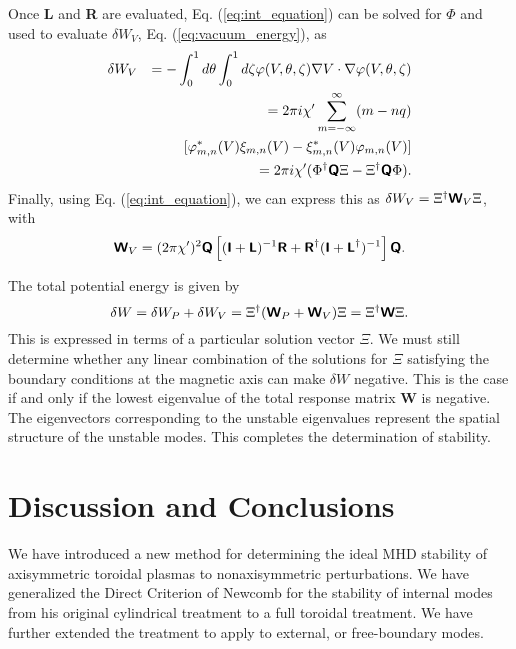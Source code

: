\documentclass[prb,twocolumn,showpacs,preprintnumbers,amsmath,amssymb]{revtex4}
\renewcommand*{\t}[1]{\hbox{\sffamily\bfseries #1}}
\begin{document}
Once \t{L} and \t{R} are evaluated, Eq. (\ref{eq:int_equation}) can be
solved for $\Phi$ and used to evaluate $\delta W_V$,
Eq. (\ref{eq:vacuum_energy}), as
\begin{eqnarray}
\delta W_V 
&&= - \int_0^1 d\theta \int_0^1 d\zeta \varphi(V,\theta,\zeta)
	\nabla V \cdot \nabla \varphi(V,\theta,\zeta) \nonumber \\
&&= 2 \pi i \chi' \sum_{m=-\infty}^\infty (m-nq) \nonumber \\
&&\qquad [\varphi^*_{m,n}(V) \xi_{m,n}(V) 
	- \xi^*_{m,n}(V) \varphi_{m,n}(V) ] \nonumber \\
&&= 2 \pi i \chi' 
	(\Phi^\dagger \t{Q} \Xi - \Xi^\dagger \t{Q} \Phi).
\end{eqnarray}
Finally, using Eq. (\ref{eq:int_equation}), we can express this as $
\delta W_V = \Xi^\dagger \t{W}_V \Xi$, with
\[
\t{W}_V = (2 \pi \chi')^2 \t{Q} 
\left[(\t{I}+\t{L})^{-1} \t{R} 
+ \t{R}^\dagger (\t{I}+\t{L}^\dagger)^{-1}\right] \t{Q}.
\]

The total potential energy is given by
\[
\delta W = \delta W_P + \delta W_V 
	= \Xi^\dagger (\t{W}_P + \t{W}_V) \Xi 
	= \Xi^\dagger \t{W} \Xi.
\]
This is expressed in terms of a particular solution vector $\Xi$.  We
must still determine whether any linear combination of the solutions for
$\Xi$ satisfying the boundary conditions at the magnetic axis can make
$\delta W$ negative.  This is the case if and only if the lowest
eigenvalue of the total response matrix \t{W} is negative.  The
eigenvectors corresponding to the unstable eigenvalues represent the
spatial structure of the unstable modes.  This completes the
determination of stability.

\section{\label{sec:conclude}Discussion and Conclusions}

We have introduced a new method for determining the ideal MHD stability
of axisymmetric toroidal plasmas to nonaxisymmetric perturbations.  We
have generalized the Direct Criterion of Newcomb for the stability of
internal modes from his original cylindrical treatment to a full
toroidal treatment.  We have further extended the treatment to apply to
external, or free-boundary modes.
\end{document}
